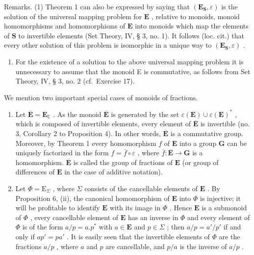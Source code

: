 Remarks. (1) Theorem 1 can also be expressed by saying that \((\mathbf{E}_{\mathbf{S}},\varepsilon)\) is the solution of the universal mapping problem for \(\mathbf{E}\) , relative to monoids, monoid homomorphisms and homomorphisms of \(\mathbf{E}\) into monoids which map the elements of \(\mathbf{S}\) to invertible elements (Set Theory, IV, § 3, no. 1). It follows (loc. cit.) that every other solution of this problem is isomorphic in a unique way to \((\mathbf{E}_{\mathbf{S}},\varepsilon)\) .

\begin{enumerate}
\def\labelenumi{(\arabic{enumi})}
\setcounter{enumi}{1}
\tightlist
\item
  For the existence of a solution to the above universal mapping problem it is unnecessary to assume that the monoid E is commutative, as follows from Set Theory, IV, § 3, no. 2 (cf.~Exercise 17).
\end{enumerate}

We mention two important special cases of monoids of fractions.

\begin{enumerate}
\def\labelenumi{(\alph{enumi})}
\item
  Let \(\overline{\mathbf{E}} = \mathbf{E}_{\mathbb{E}}\) . As the monoid \(\overline{\mathbf{E}}\) is generated by the set \(\varepsilon(\mathbf{E}) \cup \varepsilon(\mathbf{E})^*\) , which is composed of invertible elements, every element of \(\overline{\mathbf{E}}\) is invertible (no. 3, Corollary 2 to Proposition 4). In other words, \(\overline{\mathbf{E}}\) is a commutative group. Moreover, by Theorem 1 every homomorphism \(f\) of \(\mathbf{E}\) into a group \(\mathbf{G}\) can be uniquely factorized in the form \(f = \bar{f} \circ \varepsilon\) , where \(\bar{f}: \overline{\mathbf{E}} \to \mathbf{G}\) is a homomorphism. \(\overline{\mathbf{E}}\) is called the group of fractions of \(\mathbf{E}\) (or group of differences of \(\mathbf{E}\) in the case of additive notation).
\item
  Let \(\Phi = \mathrm{E}_{\Sigma}\) , where \(\Sigma\) consists of the cancellable elements of \(\mathbf{E}\) . By Proposition 6, (ii), the canonical homomorphism of \(\mathbf{E}\) into \(\Phi\) is injective; it will be profitable to identify \(\mathbf{E}\) with its image in \(\Phi\) . Hence \(\mathbf{E}\) is a submonoid of \(\Phi\) , every cancellable element of \(\mathbf{E}\) has an inverse in \(\Phi\) and every element of \(\Phi\) is of the form \(a/p = a.p^{*}\) with \(a \in \mathbf{E}\) and \(p \in \Sigma\) ; then \(a/p = a'/p'\) if and only if \(ap' = pa'\) . It is easily seen that the invertible elements of \(\Phi\) are the fractions \(a/p\) , where \(a\) and \(p\) are cancellable, and \(p/a\) is the inverse of \(a/p\) .
\end{enumerate}

